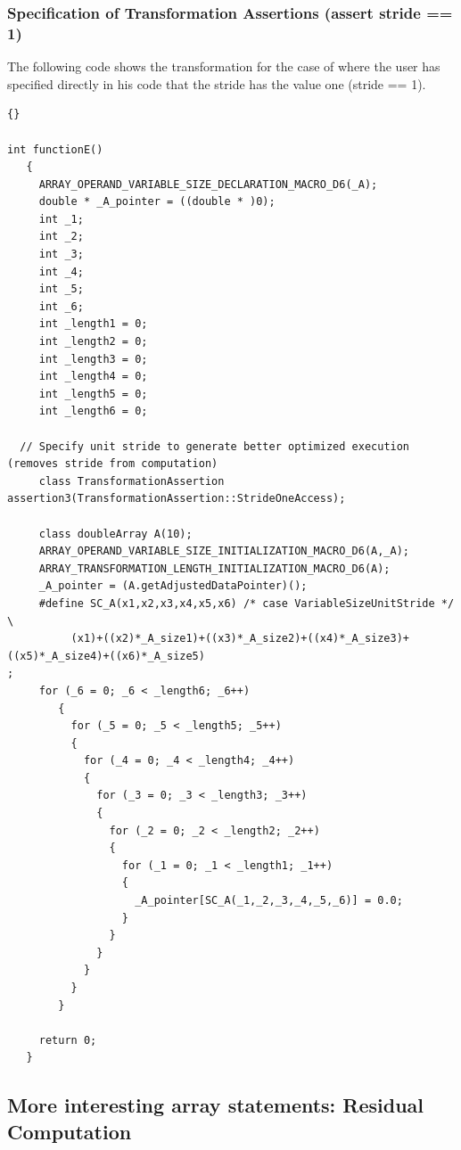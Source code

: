 \documentclass[10pt]{article}
\begin{document}
\subsubsection{Specification of Transformation Assertions (assert stride == 1)}

   The following code shows the transformation for the case of where the user has specified directly in his
code that the stride has the value one (stride == 1).

\vspace{0.5in}

\begin{lstlisting}{}

int functionE()
   { 
     ARRAY_OPERAND_VARIABLE_SIZE_DECLARATION_MACRO_D6(_A); 
     double * _A_pointer = ((double * )0); 
     int _1; 
     int _2; 
     int _3; 
     int _4; 
     int _5; 
     int _6; 
     int _length1 = 0; 
     int _length2 = 0; 
     int _length3 = 0; 
     int _length4 = 0; 
     int _length5 = 0; 
     int _length6 = 0; 

  // Specify unit stride to generate better optimized execution (removes stride from computation)
     class TransformationAssertion assertion3(TransformationAssertion::StrideOneAccess); 

     class doubleArray A(10);
     ARRAY_OPERAND_VARIABLE_SIZE_INITIALIZATION_MACRO_D6(A,_A); 
     ARRAY_TRANSFORMATION_LENGTH_INITIALIZATION_MACRO_D6(A); 
     _A_pointer = (A.getAdjustedDataPointer)(); 
     #define SC_A(x1,x2,x3,x4,x5,x6) /* case VariableSizeUnitStride */ \
          (x1)+((x2)*_A_size1)+((x3)*_A_size2)+((x4)*_A_size3)+((x5)*_A_size4)+((x6)*_A_size5)
; 
     for (_6 = 0; _6 < _length6; _6++)
        { 
          for (_5 = 0; _5 < _length5; _5++)
          { 
            for (_4 = 0; _4 < _length4; _4++)
            { 
              for (_3 = 0; _3 < _length3; _3++)
              { 
                for (_2 = 0; _2 < _length2; _2++)
                { 
                  for (_1 = 0; _1 < _length1; _1++)
                  { 
                    _A_pointer[SC_A(_1,_2,_3,_4,_5,_6)] = 0.0; 
                  } 
                } 
              } 
            } 
          } 
        } 

     return 0;
   } 

\end{lstlisting}

\subsection{More interesting array statements: Residual Computation}
\end{document}
